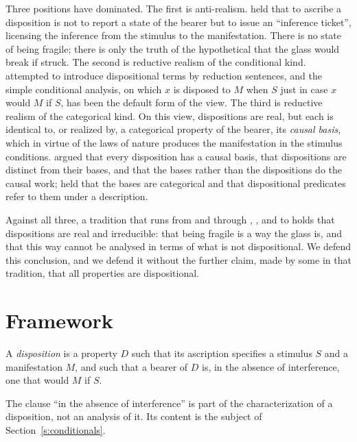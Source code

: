 \documentclass{situationist-preprint}
\begin{document}
Three positions have dominated. The first is anti-realism. \citet{Ryle1949} held that to ascribe a disposition is not to report a state of the bearer but to issue an \enquote{inference ticket}, licensing the inference from the stimulus to the manifestation. There is no state of being fragile; there is only the truth of the hypothetical that the glass would break if struck. The second is reductive realism of the conditional kind. \citet{Carnap1936} attempted to introduce dispositional terms by reduction sentences, and the simple conditional analysis, on which $x$ is disposed to $M$ when $S$ just in case $x$ would $M$ if $S$, has been the default form of the view. The third is reductive realism of the categorical kind. On this view, dispositions are real, but each is identical to, or realized by, a categorical property of the bearer, its \emph{causal basis}, which in virtue of the laws of nature produces the manifestation in the stimulus conditions. \citet{PPJ1982} argued that every disposition has a causal basis, that dispositions are distinct from their bases, and that the bases rather than the dispositions do the causal work; \citet{Armstrong1997} held that the bases are categorical and that dispositional predicates refer to them under a description.

Against all three, a tradition that runs from \citet{Mellor1974} and \citet{Shoemaker1980} through \citet{Mumford1998}, \citet{Molnar2003}, \citet{Heil2003} and \citet{Bird2007} to \citet{Vetter2015} holds that dispositions are real and irreducible: that being fragile is a way the glass is, and that this way cannot be analysed in terms of what is not dispositional. We defend this conclusion, and we defend it without the further claim, made by some in that tradition, that all properties are dispositional.

\section{Framework}\label{s:framework}

\begin{definition}[Disposition]\label{d:disp}
A \emph{disposition} is a property $D$ such that its ascription specifies a stimulus $S$ and a manifestation $M$, and such that a bearer of $D$ is, in the absence of interference, one that would $M$ if $S$.
\end{definition}

The clause \enquote{in the absence of interference} is part of the characterization of a disposition, not an analysis of it. Its content is the subject of Section~\ref{s:conditionals}.
\end{document}
